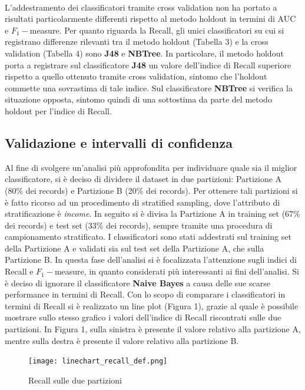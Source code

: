 \documentclass[fleqn,10pt]{SelfArx}
\begin{document}
\\
L'addestramento dei classificatori tramite cross validation non ha portato a risultati particolarmente differenti rispetto al metodo holdout in termini di AUC e $F_1-$measure. Per quanto riguarda la Recall, gli unici classificatori su cui si registrano differenze rilevanti tra il metodo holdout (Tabella 3) e la cross validation (Tabella 4) sono \textbf{J48} e \textbf{NBTree}. In particolare, il metodo holdout porta a registrare sul classificatore \textbf{J48} un valore dell'indice di Recall superiore rispetto a quello ottenuto tramite cross validation, sintomo che l'holdout commette una sovrastima di tale indice. Sul classificatore \textbf{NBTree} si verifica la situazione opposta, sintomo quindi di una sottostima da parte del metodo holdout per l'indice di Recall. 

\subsection{Validazione e intervalli di confidenza}
Al fine di svolgere un'analisi più approfondita per individuare quale sia il miglior classificatore, si è deciso di dividere il dataset in due partizioni: Partizione A (80\% dei records) e Partizione B (20\% dei records). Per ottenere tali partizioni si è fatto ricorso ad un procedimento di stratified sampling, dove l'attributo di stratificazione è \textit{income}. In seguito si è divisa la Partizione A in training set (67\% dei records) e test set (33\% dei records), sempre tramite una procedura di campionamento stratificato. I classificatori sono stati addestrati sul training set della Partizione A e validati sia sul test set della Partizione A, che sulla Partizione B. 
In questa fase dell'analisi si è focalizzata l'attenzione sugli indici di Recall e $F_1-$measure, in quanto considerati più interessanti ai fini dell'analisi. Si è deciso di ignorare il classificatore \textbf{Naive Bayes} a causa delle sue scarse performance in termini di Recall.
Con lo scopo di comparare i classificatori in termini di Recall si è realizzato un line plot (Figura 1), grazie al quale è possibile mostrare sullo stesso grafico i valori dell'indice di Recall riscontrati sulle due partizioni. In Figura 1, sulla sinistra è presente il valore relativo alla partizione A, mentre sulla destra è presente il valore relativo alla partizione B.
\begin{figure}[h!]
  \texttt{[image: linechart\_recall\_def.png]}\
  \caption{Recall sulle due partizioni}
\end{figure}
\end{document}
